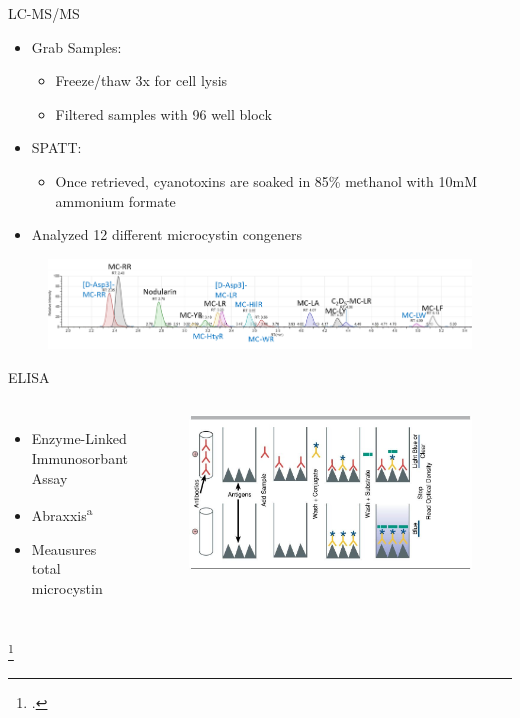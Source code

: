 \begin{frame}{LC-MS/MS}
	\begin{itemize}
		\item Grab Samples: 
		\begin{itemize}
			\item Freeze/thaw 3x for cell lysis 
			\item Filtered samples with 96 well block 
		\end{itemize}
		\item SPATT: 
		\begin{itemize}
			\item Once retrieved, cyanotoxins are soaked in 85\% methanol with 10mM ammonium formate
		\end{itemize}
		\item Analyzed 12 different microcystin congeners	
	\end{itemize}
	\begin{figure}
		\includegraphics[width=\textwidth]{../figures/LCMS_CONGENERS.png}
	\end{figure}
\end{frame}

\begin{frame}{ELISA}
	\begin{columns}
	\begin{itemize}
		\item Enzyme-Linked Immunosorbant Assay
		\item Abraxxis\textsuperscript{a}
		\item Meausures total microcystin
	\end{itemize}
	\begin{figure}
		\includegraphics[width=\textwidth]{elisa.jpg}
	\end{figure}
\end{columns}
\footcitetext{[a], noauthor_saxitoxin_nodate}
\end{frame}
